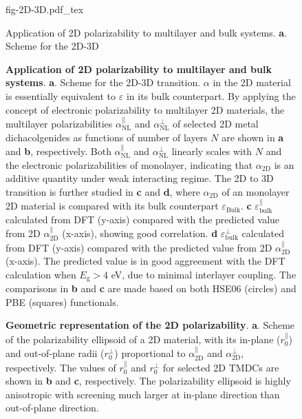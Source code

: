 \begin{figure}[!htbp]
\centering
{fig-2D-3D.pdf_tex}
  \caption{\label{fig:diel-2D-3D}  %
    Application of 2D polarizability to
    multilayer and bulk systems.
    \textbf{a}. Scheme for the 2D-3D}
\end{figure}

\begin{figure}[H]
\centering
\caption{\label{fig-4} \textbf{Application of 2D polarizability to
    multilayer and bulk systems}.  \textbf{a}. Scheme for the 2D-3D
  transition. $\alpha$ in the 2D material is essentially equivalent to
  $\varepsilon$ in its bulk counterpart.  By applying the concept of
  electronic polarizability to multilayer 2D materials, the multilayer
  polarizabilities $\alpha_{\mathrm{NL}}^{\parallel}$ and
  $\alpha_{\mathrm{NL}}^{\perp}$ of selected 2D metal dichacolgenides
  as functions of number of layers $N$ are shown in \textbf{a} and
  \textbf{b}, respectively. Both $\alpha_{\mathrm{NL}}^{\parallel}$
  and $\alpha_{\mathrm{NL}}^{\perp}$ linearly scales with $N$ and the
  electronic polarizabilities of monolayer, indicating that
  $\alpha_{\mathrm{2D}}$ is an additive quantity under weak
  interacting regime. The 2D to 3D transition is further studied in
  \textbf{c} and \textbf{d}, where $\alpha_{\mathrm{2D}}$ of an
  monolayer 2D material is compared with its bulk counterpart
  $\varepsilon_{\mathrm{Bulk}}$. \textbf{c}
  $\varepsilon_{\mathrm{bulk}}^{\parallel}$ calculated from DFT
  (y-axis) compared with the predicted value from 2D
  $\alpha_{\mathrm{2D}}^{\parallel}$ (x-axis), showing good
  correlation. \textbf{d} $\varepsilon_{\mathrm{bulk}}^{\perp}$
  calculated from DFT (y-axis) compared with the predicted value from
  2D $\alpha_{\mathrm{2D}}^{\parallel}$ (x-axis). The predicted value
  is in good aggreement with the DFT calculation when
  $E_{\mathrm{g}}>4$ eV, due to minimal interlayer coupling. The
  comparisons in \textbf{b} and \textbf{c} are made based on both
  HSE06 (circles) and PBE (squares) functionals.}
\end{figure}

\begin{figure}[H]
  \centering
  \caption{\label{fig-ellip} \textbf{Geometric representation of the
      2D polarizability}. \textbf{a}. Scheme of the polarizability
    ellipsoid of a 2D material, with its in-plane
    ($r_{0}^{\parallel}$) and out-of-plane radii
    ($r_{\mathrm{0}}^{\perp}$) proportional to
    $\alpha_{\mathrm{2D}}^{\parallel}$ and
    $\alpha_{\mathrm{2D}}^{\perp}$, respectively.  The values of
    $r_{0}^{\parallel}$ and $r_{0}^{\perp}$ for selected 2D TMDCs are
    shown in \textbf{b} and \textbf{c}, respectively.  The
    polarizability ellipsoid is highly anisotropic with screening much
    larger at in-plane direction than out-of-plane direction.}
\end{figure}







